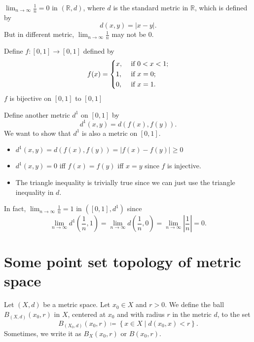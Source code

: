 \begin{eg}
    \(\lim_{n \to \infty} \frac{1}{n} = 0 \) in \((\mathbb{R} , d)\), where \(d\) is the standard metric in \(\mathbb{R} \), which is defined by 
    \[
        d(x, y) = \vert x - y \vert. 
    \]    
    But in different metric, \(\lim_{n \to \infty} \frac{1}{n} \) may not be \(0\).  
\end{eg}
\begin{explanation}
    Define \(f: [0, 1] \to [0, 1]\) defined by
\[
    f(x) = \begin{dcases}
        x, &\text{ if } 0<x<1  ;\\
        1, &\text{ if } x=0;\\
        0, &\text{ if } x=1.
    \end{dcases}
\]
\(f\) is bijective on \([0, 1]\) to \([0, 1]\)  

Define another metric \(d^1\) on \([0, 1]\) by 
\[
    d^1(x, y) = d(f(x), f(y)).
\]  
We want to show that \(d^1\) is also a metric on \([0, 1]\). 
\begin{itemize}
    \item \(d^1(x,y)=d(f(x), f(y)) = \vert f(x) - f(y) \vert \ge 0\)
    \item \(d^1(x, y) = 0\) iff \(f(x) = f(y)\) iff \(x=y\) since \(f\) is injective.  
    \item The triangle inequality is trivially true since we can just use the triangle inequality in \(d\).   
\end{itemize}  

In fact, \(\lim_{n \to \infty} \frac{1}{n} = 1 \) in \(\left( [0, 1], d^1 \right) \) since 
\[
    \lim_{n \to \infty} d^{1}\left( \frac{1}{n}, 1 \right) = \lim_{n \to \infty} d \left( \frac{1}{n}, 0 \right) = \lim_{n \to \infty} \left\vert \frac{1}{n} \right\vert = 0.      
\]  
\end{explanation}

\section{Some point set topology of metric space}
\begin{definition}[ball] \label{def: ball}
    Let \((X,d)\) be a metric space. Let \(x_0 \in X\) and \(r > 0\). We define the ball \(B_{(X, d)} (x_0, r)\) in \(X\), centered at \(x_0\) and with radius \(r\) in the metric \(d\), to the set 
    \[
        B_{(X_0, d)} (x_0, r) \coloneqq \left\{ x \in X \mid d(x_0, x) < r \right\}.
    \]
    Sometimes, we write it as \(B_X(x_0, r)\) or \(B(x_0, r)\).   
\end{definition}

